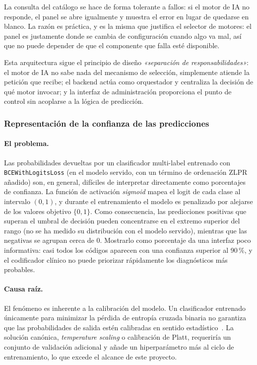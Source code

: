 La consulta del catálogo se hace de forma tolerante a fallos: si el motor de IA no responde, el panel se abre igualmente y muestra el error en lugar de quedarse en blanco. La razón es práctica, y es la misma que justifica el selector de motores: el panel es justamente donde se cambia de configuración cuando algo va mal, así que no puede depender de que el componente que falla esté disponible.


Esta arquitectura sigue el principio de diseño \emph{«separación de responsabilidades»}: el motor de IA no sabe nada del mecanismo de selección, simplemente atiende la petición que recibe; el backend actúa como orquestador y centraliza la decisión de qué motor invocar; y la interfaz de administración proporciona el punto de control sin acoplarse a la lógica de predicción.

\subsubsection{Representación de la confianza de las predicciones}
\label{sec:confianza-predicciones}

\paragraph{El problema.}
Las probabilidades devueltas por un clasificador multi-label entrenado con \texttt{BCEWithLogitsLoss} (en el modelo servido, con un término de ordenación ZLPR añadido) son, en general, difíciles de interpretar directamente como porcentajes de confianza. La función de activación \emph{sigmoid} mapea el logit de cada clase al intervalo $(0, 1)$, y durante el entrenamiento el modelo es penalizado por alejarse de los valores objetivo $\{0, 1\}$. Como consecuencia, las predicciones positivas que superan el umbral de decisión pueden concentrarse en el extremo superior del rango (no se ha medido su distribución con el modelo servido), mientras que las negativas se agrupan cerca de 0. Mostrarlo como porcentaje da una interfaz poco informativa: casi todos los códigos aparecen con una confianza superior al 90\,\%, y el codificador clínico no puede priorizar rápidamente los diagnósticos más probables.

\paragraph{Causa raíz.}
El fenómeno es inherente a la calibración del modelo. Un clasificador entrenado únicamente para minimizar la pérdida de entropía cruzada binaria no garantiza que las probabilidades de salida estén calibradas en sentido estadístico~\cite{Guo17}. La solución canónica, \emph{temperature scaling} o calibración de Platt, requeriría un conjunto de validación adicional y añade un hiperparámetro más al ciclo de entrenamiento, lo que excede el alcance de este proyecto.


